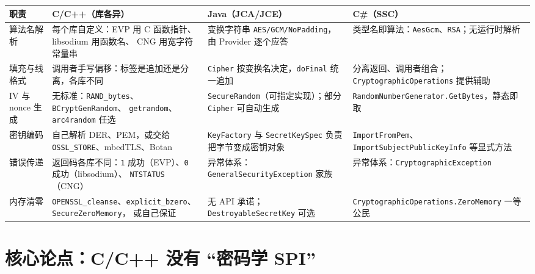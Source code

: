 \documentclass[12pt,a4paper,fontset=fandol]{ctexbook}
\newcommand{\Tp}[1]{\texttt{#1}}
\newcommand{\CSharp}{C\#}
\newcommand{\CppJava}{C/C++}
\begin{document}
\begin{footnotesize}
\begin{longtable}{@{}>{\raggedright\arraybackslash}p{}
                  >{\raggedright\arraybackslash}p{}
                  >{\raggedright\arraybackslash}p{}
                  >{\raggedright\arraybackslash}p{}@{}}
\toprule
\textbf{职责} & \textbf{\CppJava{}（库各异）} & \textbf{Java（JCA/JCE）} &
\textbf{\CSharp{}（SSC）} \\
\midrule
算法名解析 &
每个库自定义：EVP 用 C 函数指针、libsodium 用函数名、
CNG 用宽字符常量串 &
变换字符串 \texttt{AES/GCM/\allowbreak{}\allowbreak NoPadding}，
由 Provider 逐个应答 &
类型名即算法：\Tp{AesGcm}、\Tp{RSA}；无运行时解析 \\
\addlinespace
填充与线格式 &
调用者手写偏移：标签是追加还是分离，各库不同 &
\Tp{Cipher} 按变换名决定，\Tp{doFinal} 统一追加 &
分离返回、调用者组合；\Tp{Cryptographic\allowbreak Operations} 提供辅助 \\
\addlinespace
IV 与 nonce 生成 &
无标准：\Tp{RAND\_bytes}、\Tp{BCryptGen\allowbreak Random}、
\Tp{getrandom}、\Tp{arc4random} 任选 &
\Tp{SecureRandom}（可指定实现）；部分 \Tp{Cipher} 可自动生成 &
\Tp{RandomNumber\allowbreak Generator.GetBytes}，静态即取 \\
\addlinespace
密钥编码 &
自己解析 DER、PEM，或交给 \Tp{OSSL\_STORE}、mbedTLS、Botan &
\Tp{KeyFactory} 与 \Tp{SecretKeySpec} 负责把字节变成密钥对象 &
\Tp{ImportFromPem}、\Tp{ImportSubject\allowbreak PublicKeyInfo} 等显式方法 \\
\addlinespace
错误传递 &
返回码各库不同：\texttt{1} 成功（EVP）、\texttt{0} 成功（libsodium）、
\texttt{NTSTATUS}（CNG） &
异常体系：\Tp{General\allowbreak Security\allowbreak Exception} 家族 &
异常体系：\Tp{Cryptographic\allowbreak Exception} \\
\addlinespace
内存清零 &
\Tp{OPENSSL\_cleanse}、\Tp{explicit\_bzero}、\Tp{SecureZero\allowbreak Memory}，
或自己保证 &
无 API 承诺；\Tp{Destroyable\allowbreak SecretKey} 可选 &
\Tp{Cryptographic\allowbreak Operations.\allowbreak ZeroMemory} 一等公民 \\
\bottomrule
\end{longtable}
\end{footnotesize}

\section{核心论点：\CppJava{} 没有 ``密码学 SPI''}
\end{document}
